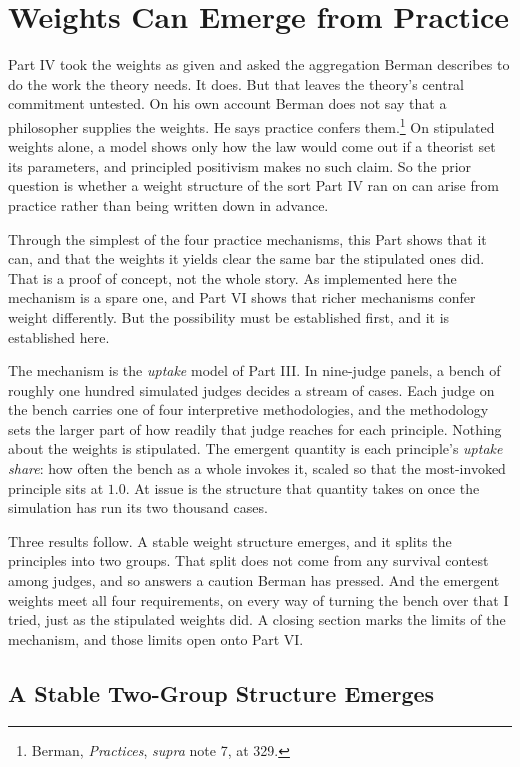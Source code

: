 \section{Weights Can Emerge from Practice}

Part IV took the weights as given and asked the aggregation Berman
describes to do the work the theory needs. It does. But that leaves the
theory's central commitment untested. On his own account Berman does not say that a philosopher supplies the
weights. He says practice confers them.\footnote{Berman, \textit{Practices}, \textit{supra} note 7, at
329.} On stipulated weights alone, a model shows only how the law would come out if
a theorist set its parameters, and principled positivism makes no such claim. So the prior question is whether a weight
structure of the sort Part IV ran on can arise from practice rather than
being written down in advance.

Through the simplest of the four practice mechanisms, this Part shows that it can,
and that the weights it yields clear the same bar the stipulated ones did. That is a proof of concept, not the whole story. As implemented here the mechanism is a spare one, and Part VI shows that
richer mechanisms confer weight differently. But the possibility must be
established first, and it is established here.

The mechanism is the \textit{uptake} model of Part III. In nine-judge panels, a bench of roughly one hundred simulated judges
decides a stream of cases. Each judge on the bench carries one of four interpretive
methodologies, and the methodology sets the larger part of how readily that
judge reaches for each principle. Nothing about
the weights is stipulated. The emergent quantity is each principle's \textit{uptake share}: how often the bench
as a whole invokes it, scaled so that the most-invoked principle sits at
$1.0$. At issue is the structure that quantity takes on once the simulation has
run its two thousand cases.

Three results follow. A stable weight structure emerges, and it splits the principles into two
groups. That split does not come from any survival contest among judges,
and so answers a caution Berman has pressed. And the emergent weights meet
all four requirements, on every way of turning the bench over that I tried,
just as the stipulated weights did. A closing section marks the limits of the
mechanism, and those limits open onto Part VI.

\subsection{A Stable Two-Group Structure Emerges}

